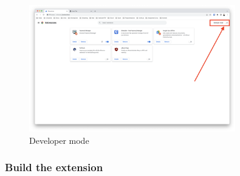 \begin{figure}[htb]
	\centering
	\includegraphics[width=0.8\textwidth]{images/extension/developer-mode.png}
	\caption{Developer mode}
	\label{fig:developer_mode}
\end{figure}

\subsubsection{Build the extension}

